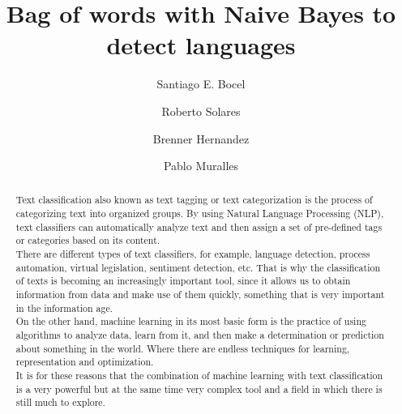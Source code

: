 \documentclass[sigconf,12pt,review=false,natbib=false]{acmart}
\begin{document}
\renewcommand\footnotetextcopyrightpermission[1]{}
\pagestyle{plain}

\title{Bag of words with Naive Bayes to detect languages}


\author{Santiago E. Bocel}

\author{Roberto Solares}

\author{Brenner Hernandez}

\author{Pablo Muralles}

\begin{abstract}

Text classification also known as text tagging or text categorization is the process of categorizing
text into organized groups. By using Natural Language Processing (NLP), text classifiers can
automatically analyze text and then assign a set of pre-defined tags or categories based on its
content. \\

There are different types of text classifiers, for example, language detection, process automation,
virtual legislation, sentiment detection, etc. That is why the classification of texts is becoming
an increasingly important tool, since it allows us to obtain information from data and make use of
them quickly, something that is very important in the information age. \\

On the other hand, machine learning in its most basic form is the practice of using algorithms to
analyze data, learn from it, and then make a determination or prediction about something in the
world. Where there are endless techniques for learning, representation and optimization. \\

It is for these reasons that the combination of machine learning with text classification is a very
powerful but at the same time very complex tool and a field in which there is still much to
explore. \\

\end{abstract}
\end{document}
